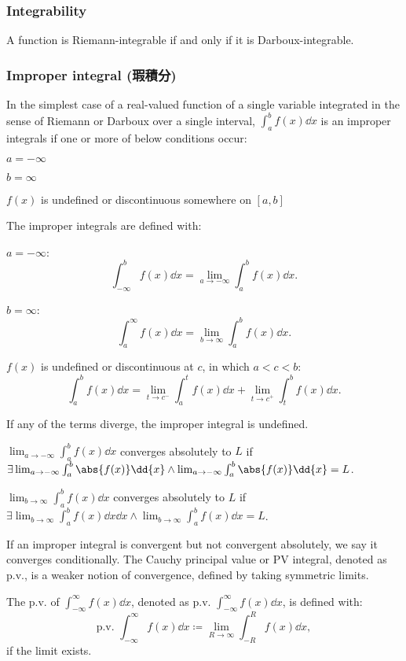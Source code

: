 \documentclass[a4paper,12pt]{report}
\begin{document}
\subsubsection{Integrability}
A function is Riemann-integrable if and only if it is Darboux-integrable.
\subsubsection{Improper integral (瑕積分)}
In the simplest case of a real-valued function of a single variable integrated in the sense of Riemann or Darboux over a single interval, $\int _{a}^{b}f(x)\dd{x}$ is an improper integrals if one or more of below conditions occur: 
\ben
\item$a=-\infty$
\item$b=\infty$
\item$f(x)$ is undefined or discontinuous somewhere on $[a,b]$
\een

The improper integrals are defined with:
\bit
\item $a=-\infty$:
\[\int _{-\infty }^bf(x)\dd{x}=\lim _{a\to -\infty }\int _{a}^{b}f(x)\dd{x}.\]
\item $b=\infty$:
\[\int _{a}^{\infty }f(x)\dd{x}=\lim _{b\to \infty }\int _{a}^{b}f(x)\dd{x}.\]
\item $f(x)$ is undefined or discontinuous at $c$, in which $a<c<b$:
\[\int _{a}^{b}f(x)\dd{x}=\lim_{t\to c^-}\int _{a}^{t}f(x)\dd{x}+\lim_{t\to c^+}\int _{t}^{b}f(x)\dd{x}.\]
\item If any of the terms diverge, the improper integral is undefined.
\eit

$\lim _{a\to -\infty }\int _{a}^{b}f(x)\dd{x}$ converges absolutely to $L$ if $\exists\lim _{a\to -\infty }\int _{a}^{b}\abs{f(x)}\dd{x}\land\lim _{a\to -\infty }\int _{a}^{b}\abs{f(x)}\dd{x}=L$.

$\lim _{b\to \infty }\int _{a}^{b}f(x)\dd{x}$ converges absolutely to $L$ if $\exists\lim _{b\to \infty }\int _{a}^{b}f(x)\dd{x}\dd{x}\land\lim _{b\to \infty }\int _{a}^{b}f(x)\dd{x}=L$.

If an improper integral is convergent but not convergent absolutely, we say it converges conditionally.
The Cauchy principal value or PV integral, denoted as p.v., is a weaker notion of convergence, defined by taking symmetric limits. 

The p.v. of $\int _{-\infty}^{\infty}f(x)\dd{x}$, denoted as $\text{p.v.\ }\int_{-\infty}^{\infty} f(x)\dd{x}$, is defined with:
\[\text{p.v.\ }\int_{-\infty}^{\infty} f(x)\dd{x}\coloneq\lim_{R\to\infty} \int_{-R}^{R} f(x)\dd{x},\]
if the limit exists.
\end{document}
